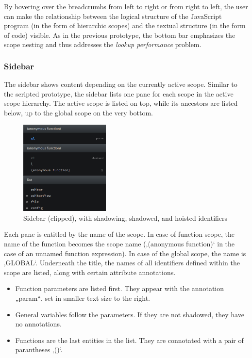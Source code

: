 By hovering over the breadcrumbs from left to right or from right to
left, the user can make the relationship between the logical structure
of the JavaScript program (in the form of hierarchic scopes) and the
textual structure (in the form of code) visible. As in the previous
prototype, the bottom bar emphasizes the scope nesting and thus
addresses the \emph{lookup performance} problem.

\subsubsection{Sidebar}\label{sidebar}

The sidebar shows content depending on the currently active scope.
Similar to the scripted prototype, the sidebar lists one pane for each
scope in the active scope hierarchy. The active scope is listed on top,
while its ancestors are listed below, up to the global scope on the very
bottom.

\begin{figure}[H]
\centering
\includegraphics[keepaspectratio,width=0.4\textwidth]{img/sidebar.png}
\caption{Sidebar (clipped), with shadowing, shadowed, and hoisted identifiers}
\label{fig:protosidebar}
\end{figure}

Each pane is entitled by the name of the scope. In case of function
scope, the name of the function becomes the scope name (‚(anonymous
function)‘ in the case of an unnamed function expression). In case of
the global scope, the name is ‚GLOBAL‘. Underneath the title, the names
of all identifiers defined within the scope are listed, along with
certain attribute annotations.

\begin{itemize}
\itemsep1pt\parskip0pt
\item
  Function parameters are listed first. They appear with the annotation
  „param“, set in smaller text size to the right.
\item
  General variables follow the parameters. If they are not shadowed,
  they have no annotations.
\item
  Functions are the last entities in the list. They are connotated with
  a pair of parantheses ‚()‘.
\end{itemize}

